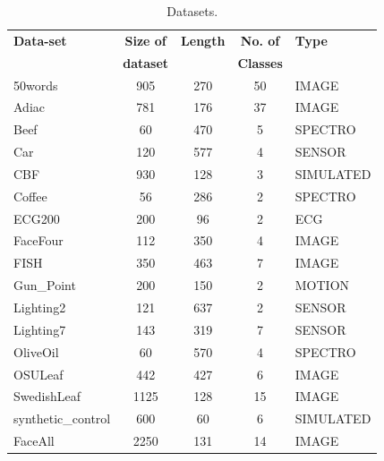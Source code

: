 \begin{table}[ht]
\centering
\small
\begin{tabular}{lcccl}
\textbf{Data-set}   & \textbf{Size of  } & \textbf{Length} & \textbf{No. of  } & \textbf{Type} \\
\textbf{ }   & \textbf{  dataset} & \textbf{ } & \textbf{  Classes} & \textbf{ } \\
50words            & 905                      & 270             & 50                      & IMAGE         \\
Adiac              & 781                      & 176             & 37                      & IMAGE         \\
Beef               & 60                       & 470             & 5                       & SPECTRO       \\
Car                & 120                      & 577             & 4                       & SENSOR        \\
CBF                & 930                      & 128             & 3                       & SIMULATED     \\
Coffee             & 56                       & 286             & 2                       & SPECTRO       \\
ECG200             & 200                      & 96              & 2                       & ECG           \\
FaceFour           & 112                      & 350             & 4                       & IMAGE         \\
FISH               & 350                      & 463             & 7                       & IMAGE         \\
Gun\_Point         & 200                      & 150             & 2                       & MOTION        \\
Lighting2          & 121                      & 637             & 2                       & SENSOR        \\
Lighting7          & 143                      & 319             & 7                       & SENSOR        \\
OliveOil           & 60                       & 570             & 4                       & SPECTRO       \\
OSULeaf            & 442                      & 427             & 6                       & IMAGE         \\
SwedishLeaf        & 1125                     & 128             & 15                      & IMAGE         \\
synthetic\_control & 600                      & 60              & 6                       & SIMULATED     \\
FaceAll            & 2250                     & 131             & 14                      & IMAGE        
\end{tabular}
\caption{Datasets.}
\label{datasets}
\end{table}

